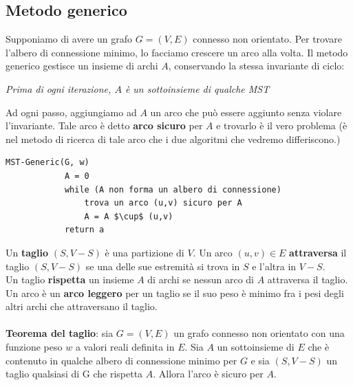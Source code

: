 \subsection{Metodo generico}
Supponiamo di avere un grafo $G=(V,E)$ connesso non orientato. Per trovare l'albero di connessione minimo, lo facciamo crescere un arco alla volta. Il metodo generico gestisce un insieme di archi $A$, conservando la stessa invariante di ciclo:
    \begin{center}
        \textit{Prima di ogni iterazione, $A$ è un sottoinsieme di qualche MST}
    \end{center}
Ad ogni passo, aggiungiamo ad $A$ un arco che può essere aggiunto senza violare l'invariante. Tale arco è detto \textbf{arco sicuro} per $A$ e trovarlo è il vero problema (è nel metodo di ricerca di tale arco che i due algoritmi che vedremo differiscono.)
    \begin{lstlisting}[label = Generic MST]
        MST-Generic(G, w)
            A = 0
            while (A non forma un albero di connessione)
                trova un arco (u,v) sicuro per A
                A = A $\cup$ (u,v)
            return a
    \end{lstlisting}
Un \textbf{taglio} $(S, V-S)$ è una partizione di $V$. Un arco $(u, v) \in E$ \textbf{attraversa} il taglio $(S, V-S)$ se una delle sue estremità si trova in $S$ e l'altra in $V-S$.\\
Un taglio \textbf{rispetta} un insieme $A$ di archi se nessun arco di $A$ attraversa il taglio.\\
Un arco è un \textbf{arco leggero} per un taglio se il suo peso è minimo fra i pesi degli altri archi che attraversano il taglio.\\\\
\textbf{Teorema del taglio}: sia $G = (V,E)$ un grafo connesso non orientato con una funzione peso $w$ a valori reali definita in $E$. Sia $A$ un sottoinsieme di $E$ che è contenuto in qualche albero di connessione minimo per $G$ e sia $(S, V-S)$ un taglio qualsiasi di G che rispetta $A$. Allora l'arco è sicuro per $A$.  

